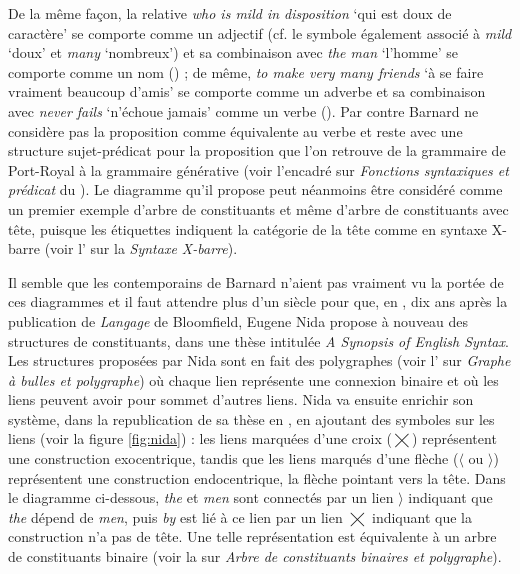 {    De la même façon, la relative \textit{who is mild in disposition} ‘qui est doux de caractère’ se comporte comme un adjectif (cf. le symbole       également associé à \textit{mild} ‘doux’ et \textit{many} ‘nombreux’) et sa combinaison avec \textit{the man} ‘l’homme’ se comporte comme un nom () ; de même, \textit{to make very many friends} ‘à se faire vraiment beaucoup d’amis’ se comporte comme un adverbe et sa combinaison avec \textit{never fails} ‘n’échoue jamais’ comme un verbe (). Par contre Barnard ne considère pas la proposition comme équivalente au verbe et reste avec une structure sujet-prédicat pour la proposition que l’on retrouve de la grammaire de Port-Royal à la grammaire générative (voir l’encadré sur \textit{Fonctions syntaxiques et prédicat} du ). Le diagramme qu’il propose peut néanmoins être considéré comme un premier exemple d’arbre de constituants et même d’arbre de constituants avec tête, puisque les étiquettes indiquent la catégorie de la tête comme en syntaxe X-barre (voir l’ sur la \textit{Syntaxe X-barre}).




    Il semble que les contemporains de Barnard n’aient pas vraiment vu la portée de ces diagrammes et il faut attendre plus d’un siècle pour que, en \citeyear{nida1943morphology}, dix ans après la publication de \textit{Langage} de Bloomfield, Eugene Nida propose à nouveau des structures de constituants, dans une thèse intitulée \textit{A Synopsis of English Syntax}. Les structures proposées par Nida sont en fait des polygraphes (voir l’ sur \textit{Graphe à bulles et polygraphe}) où chaque lien représente une connexion binaire et où les liens peuvent avoir pour sommet d’autres liens. Nida va ensuite enrichir son système, dans la republication de sa thèse en \citeyear{nida1966synopsys}, en ajoutant des symboles sur les liens (voir la figure \ref{fig:nida}) : les liens marquées d’une croix ($\bigtimes$) représentent une construction exocentrique, tandis que les liens marqués d’une flèche ($\langle$ ou $\rangle$) représentent une construction endocentrique, la flèche pointant vers la tête. Dans le diagramme ci-dessous, \textit{the} et \textit{men} sont connectés par un lien $\rangle$ indiquant que \textit{the} dépend de \textit{men}, puis \textit{by} est lié à ce lien par un lien $\bigtimes$ indiquant que la construction n’a pas de tête. Une telle représentation est équivalente à un arbre de constituants binaire (voir la  sur \textit{Arbre de constituants binaires et polygraphe}).

}
